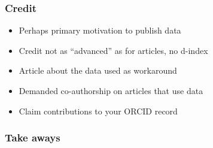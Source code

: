 \documentclass{beamer}
\begin{document}
\begin{frame}
  \frametitle{Credit}
  
  \begin{itemize}
  \item Perhaps primary motivation to publish data
  \item Credit not as ``advanced'' as for articles, no d-index
  \item Article about the data used as workaround
  \item Demanded co-authorship on articles that use data
  \item Claim contributions to your ORCID record
  \end{itemize}
\end{frame}

\begin{frame}
  \frametitle{Take aways}
  
\end{frame}
\end{document}
